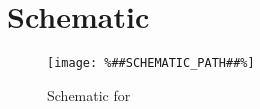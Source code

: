 \section{Schematic}
\begin{figure}[hbt]
\centering
\texttt{[image: \%\#\#SCHEMATIC\_PATH\#\#\%]}
\caption{Schematic for \spicedcdesign}
\end{figure}